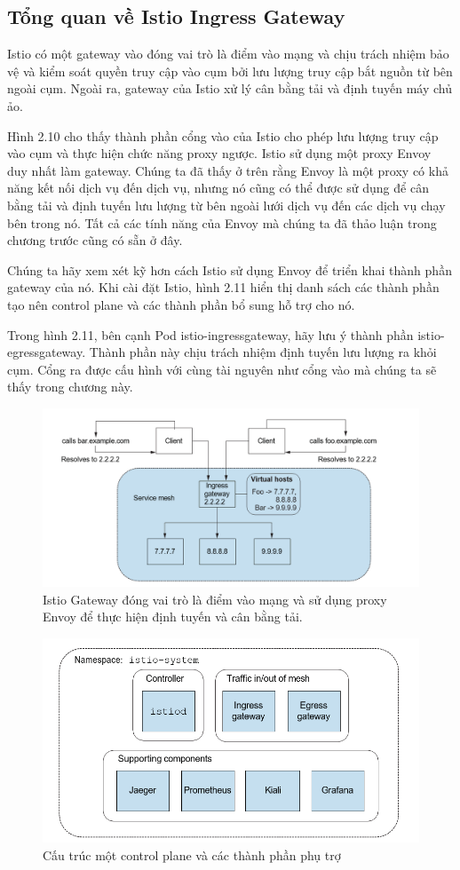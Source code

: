 \documentclass[12pt,a4paper]{report}
\begin{document}
		\subsection{Tổng quan về Istio Ingress Gateway}
		\hspace{0.6cm}Istio có một gateway vào đóng vai trò là điểm vào mạng và chịu trách nhiệm bảo vệ và kiểm soát quyền truy cập vào cụm bởi lưu lượng truy cập bắt nguồn từ bên ngoài cụm. Ngoài ra, gateway của Istio xử lý cân bằng tải và định tuyến máy chủ ảo.
		
		Hình 2.10 cho thấy thành phần cổng vào của Istio cho phép lưu lượng truy cập vào cụm và thực hiện chức năng proxy ngược. Istio sử dụng một proxy Envoy duy nhất làm gateway. Chúng ta đã thấy ở trên rằng Envoy là một proxy có khả năng kết nối dịch vụ đến dịch vụ, nhưng nó cũng có thể được sử dụng để cân bằng tải và định tuyến lưu lượng từ bên ngoài lưới dịch vụ đến các dịch vụ chạy bên trong nó. Tất cả các tính năng của Envoy mà chúng ta đã thảo luận trong chương trước cũng có sẵn ở đây.
		
		Chúng ta hãy xem xét kỹ hơn cách Istio sử dụng Envoy để triển khai thành phần gateway của nó. Khi cài đặt Istio, hình 2.11 hiển thị danh sách các thành phần tạo nên control plane và các thành phần bổ sung hỗ trợ cho nó.
		
		Trong hình 2.11, bên cạnh Pod istio-ingressgateway, hãy lưu ý thành phần istio-egressgateway. Thành phần này chịu trách nhiệm định tuyến lưu lượng ra khỏi cụm. Cổng ra được cấu hình với cùng tài nguyên như cổng vào mà chúng ta sẽ thấy trong chương này.
		
		\begin{figure}[h]
			\centering
			\includegraphics[width=0.7\linewidth]{Pics/2.2.1-p1}
			\caption{Istio Gateway đóng vai trò là điểm vào mạng và sử dụng proxy Envoy để thực hiện định tuyến và cân bằng tải.}
			\label{fig:2.2.1-1}
		\end{figure}
		
		\begin{figure}[h]
			\centering
			\includegraphics[width=0.7\linewidth]{Pics/2.2.1-p2}
			\caption{Cấu trúc một control plane và các thành phần phụ trợ}
			\label{fig:2.2.1-2}
		\end{figure}
		
\end{document}
